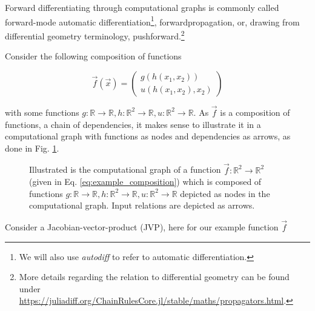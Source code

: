 Forward differentiating through computational graphs is commonly called forward-mode
automatic differentiation\footnote{We will also use \textit{autodiff} to refer to automatic differentiation.}, forwardpropagation, or, drawing from differential geometry
terminology, pushforward.\footnote{More details regarding the relation to
differential geometry can be found under \href{https://juliadiff.org/ChainRulesCore.jl/stable/maths/propagators.html}{https://juliadiff.org/ChainRulesCore.jl/stable/maths/propagators.html}.}



Consider the following composition of functions

\begin{equation}
    \vec{f}(\vec{x}) = 
    \begin{pmatrix}
        g(h(x_1,x_2)) \\
        u(h(x_1, x_2), x_2)
    \end{pmatrix}
    \label{eq:example_composition}
\end{equation}

with some functions $g: \mathbb{R} \rightarrow \mathbb{R}, h: \mathbb{R}^2 \rightarrow \mathbb{R}, u: \mathbb{R}^2 \rightarrow \mathbb{R}$.
As $\vec{f}$ is a composition of functions, a chain of dependencies,
it makes sense to illustrate it in a computational graph with functions as nodes and dependencies
as arrows, as done in Fig. \ref{fig:comp_graph}.

\begin{figure}[!htb]
 \centering
 \hfill
 \caption{Illustrated is the computational graph of a function $\vec{f}: \mathbb{R}^2 \rightarrow \mathbb{R}^2$ (given in Eq. \ref{eq:example_composition})
 which is composed of functions $g: \mathbb{R} \rightarrow \mathbb{R}, h: \mathbb{R}^2 \rightarrow \mathbb{R}, u: \mathbb{R}^2 \rightarrow \mathbb{R}$
 depicted as nodes in the computational graph. Input relations are depicted as arrows.}
 \label{fig:comp_graph}
\end{figure}

Consider a Jacobian-vector-product (JVP), here for our example function $\vec{f}$

